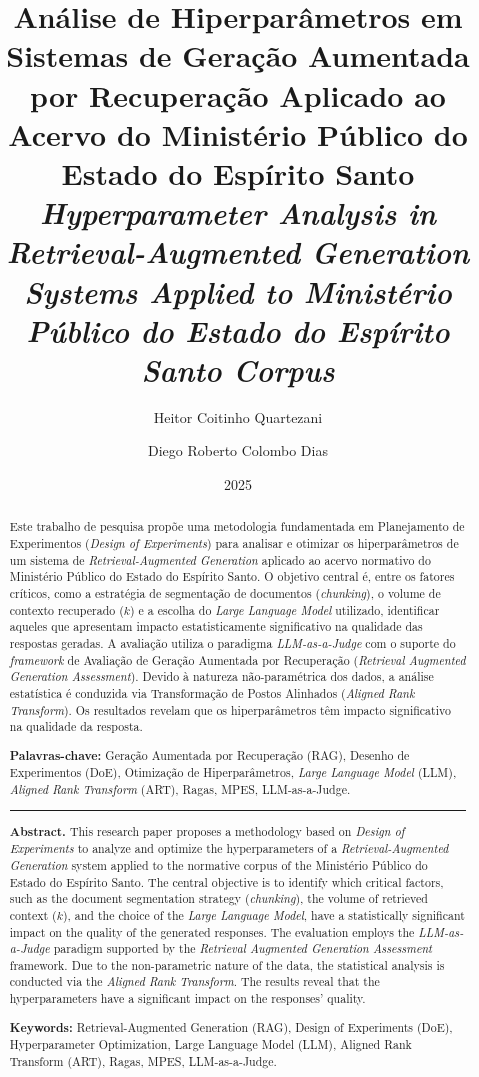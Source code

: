 \documentclass[a4paper, 10pt]{article}
\title{\textbf{Análise de Hiperparâmetros em Sistemas de Geração Aumentada por Recuperação Aplicado ao Acervo do Ministério Público do Estado do Espírito Santo} \\
\Large\textit{\textcolor{engtitle}{Hyperparameter Analysis in Retrieval-Augmented Generation Systems Applied to Ministério Público do Estado do Espírito Santo Corpus}}}
\author[1]{Heitor Coitinho Quartezani}
\author[1]{Diego Roberto Colombo Dias}
\affil[1]{Departamento de Estatística -- Universidade Federal do Espírito Santo (UFES)}
\date{2025}
\begin{document}
\maketitle

\begin{abstract}
  Este trabalho de pesquisa propõe uma metodologia fundamentada em Planejamento de Experimentos (\textit{Design of Experiments}) para analisar e otimizar os hiperparâmetros de um sistema de \textit{Retrieval-Augmented Generation} aplicado ao acervo normativo do Ministério Público do Estado do Espírito Santo. O objetivo central é, entre os fatores críticos, como a estratégia de segmentação de documentos (\textit{chunking}), o volume de contexto recuperado ($k$) e a escolha do \textit{Large Language Model} utilizado, identificar aqueles que apresentam impacto estatisticamente significativo na qualidade das respostas geradas. A avaliação utiliza o paradigma \textit{LLM-as-a-Judge} com o suporte do \textit{framework} de Avaliação de Geração Aumentada por Recuperação (\textit{Retrieval Augmented Generation Assessment}). Devido à natureza não-paramétrica dos dados, a análise estatística é conduzida via Transformação de Postos Alinhados (\textit{Aligned Rank Transform}). Os resultados revelam que os hiperparâmetros têm impacto significativo na qualidade da resposta.

  \vspace{0.5em}

  \noindent\textbf{Palavras-chave:} Geração Aumentada por Recuperação (RAG), Desenho de Experimentos (DoE), Otimização de Hiperparâmetros, \textit{Large Language Model} (LLM), \textit{Aligned Rank Transform} (ART), Ragas, MPES, LLM-as-a-Judge.

  \vspace{1em}
  \hrule
  \vspace{1em}

  \noindent\textbf{Abstract.} This research paper proposes a methodology based on \textit{Design of Experiments} to analyze and optimize the hyperparameters of a \textit{Retrieval-Augmented Generation} system applied to the normative corpus of the Ministério Público do Estado do Espírito Santo. The central objective is to identify which critical factors, such as the document segmentation strategy (\textit{chunking}), the volume of retrieved context ($k$), and the choice of the \textit{Large Language Model}, have a statistically significant impact on the quality of the generated responses. The evaluation employs the \textit{LLM-as-a-Judge} paradigm supported by the \textit{Retrieval Augmented Generation Assessment} framework. Due to the non-parametric nature of the data, the statistical analysis is conducted via the \textit{Aligned Rank Transform}. The results reveal that the hyperparameters have a significant impact on the responses' quality.

  \vspace{0.5em}

  \noindent\textbf{Keywords:} Retrieval-Augmented Generation (RAG), Design of Experiments (DoE), Hyperparameter Optimization, Large Language Model (LLM), Aligned Rank Transform (ART), Ragas, MPES, LLM-as-a-Judge.
\end{abstract}
\end{document}
